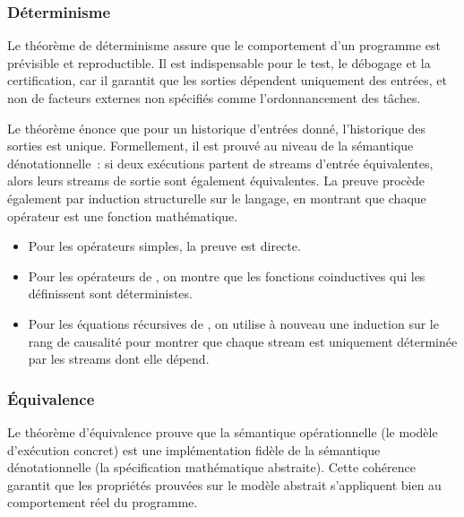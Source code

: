 \subsubsection{Déterminisme}

Le théorème de déterminisme assure que le comportement d'un programme est prévisible et
reproductible. Il est indispensable pour le test, le débogage et la certification, car il garantit
que les sorties dépendent uniquement des entrées, et non de facteurs externes non spécifiés comme
l'ordonnancement des tâches.

Le théorème énonce que pour un historique d'entrées donné, l'historique des sorties est unique.
Formellement, il est prouvé au niveau de la sémantique dénotationnelle~: si deux exécutions partent
de streams d'entrée équivalentes, alors leurs streams de sortie sont également équivalentes.
%
La preuve procède également par induction structurelle sur le langage, en montrant que chaque
opérateur est une fonction mathématique.
\begin{itemize}
      \item Pour les opérateurs simples, la preuve est directe.
      \item Pour les opérateurs de \GReact, on montre que les fonctions coinductives qui les
            définissent sont déterministes.
      \item Pour les équations récursives de \GRSync, on utilise à nouveau une induction sur le rang
            de causalité pour montrer que chaque stream est uniquement déterminée par les streams
            dont elle dépend.
\end{itemize}

\subsubsection{Équivalence}

Le théorème d'équivalence prouve que la sémantique opérationnelle (le modèle d'exécution concret)
est une implémentation fidèle de la sémantique dénotationnelle (la spécification mathématique
abstraite). Cette cohérence garantit que les propriétés prouvées sur le modèle abstrait s'appliquent
bien au comportement réel du programme.

